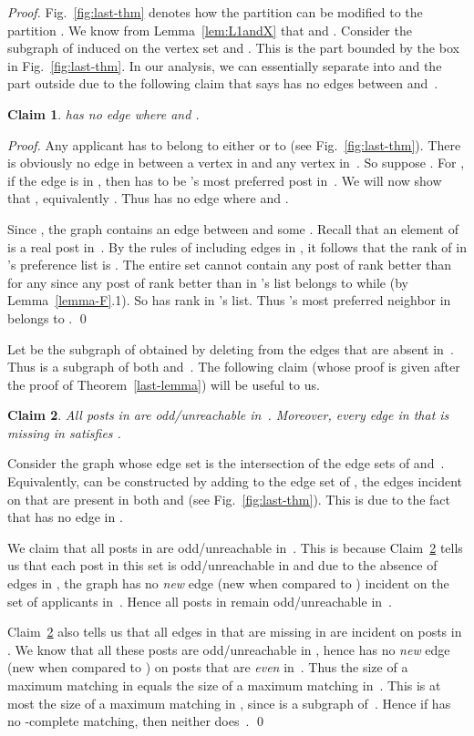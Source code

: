\documentclass[11pt]{llncs}
\newtheorem{new-claim}{Claim}
\begin{document}
\begin{proof}
Fig.~\ref{fig:last-thm} denotes how the partition  can be
modified to the partition . We know from  Lemma~\ref{lem:L1andX} 
that  and .
Consider the subgraph  of  induced on the vertex set 
 and . 
This is the part bounded by the box in Fig.~\ref{fig:last-thm}. 
In our analysis, we can essentially separate  into  and the part outside  
due to the following claim that says  has no edges between  and~.

\begin{new-claim}
\label{claim1}
 has no edge  where  and . 
\end{new-claim}
\begin{proof}
Any applicant  has to belong to either  or to 
 (see Fig.~\ref{fig:last-thm}). 
There is obviously no edge in  between a vertex in  and any vertex in~. So suppose . For , if the edge 
is in , then  has to be 's most preferred post in~. We will now show that 
, equivalently . 
Thus  has no edge  where  and .

Since , the graph  contains an edge between  and some 
. Recall that an element of  is a real post in~. 
By the rules of including edges in , it follows that the rank of  in 's preference 
list is . The entire set  cannot contain any post of rank better than  for any 
 since any post of rank better than  in 's list belongs to  while 
 (by Lemma~\ref{lemma-F}.1). So  has rank  in 's list.
Thus 's most preferred neighbor in  belongs to . \qed
\end{proof}




Let  be the subgraph of  obtained by deleting from  the edges that are absent 
in~. Thus  is a subgraph of both  and~. The following claim (whose proof is given 
after the proof of Theorem~\ref{last-lemma}) will be useful to us.

\begin{new-claim}
\label{claim2}
All posts in  are odd/unreachable in~.
Moreover, every edge  in  that is missing in  satisfies 
.
\end{new-claim}

Consider the graph  whose edge set is the intersection of the edge sets of 
and~. Equivalently,  can be constructed by adding to the edge set of ,
the edges incident on  that are present 
in both  and  (see Fig.~\ref{fig:last-thm}).
This is due to the fact that  has no edge in .  


We claim that all posts in  are odd/unreachable in~. This is because Claim~\ref{claim2} tells us that each post in this set is 
odd/unreachable in  and due to the absence of  edges in , the graph 
 has no {\em new} edge (new when compared to ) incident on the set  of 
applicants in~. Hence all posts in  remain 
odd/unreachable in~.

Claim~\ref{claim2} also tells us that all edges in  that are missing in  are incident 
on posts in . We know that all these posts are 
odd/unreachable in , hence  has no {\em new} edge (new when compared to ) on 
posts that are {\em even} in~. Thus the size of a maximum matching in  equals the 
size of a maximum matching in~. This is at most the size of a maximum matching in , 
since  is a subgraph of~. 
Hence if  has no -complete matching, then neither does~. \qed
\end{proof}
\end{document}
